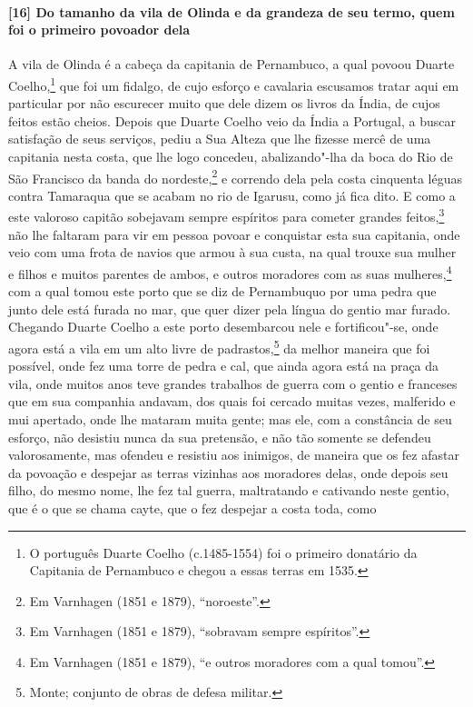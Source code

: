 \begin{linenumbers}
\paragraph{[16] Do tamanho da vila de Olinda e da grandeza de seu termo, quem foi o primeiro
povoador dela} \quad
A vila de Olinda é a cabeça da capitania de Pernambuco, a qual povoou Duarte
Coelho,\footnote{ O português Duarte Coelho (c.1485-1554) foi o primeiro donatário da
Capitania de Pernambuco e chegou a essas terras em 1535.} que foi um fidalgo, de cujo
esforço e cavalaria escusamos tratar aqui em particular por não escurecer muito que dele
dizem os livros da Índia, de cujos feitos estão cheios. Depois que Duarte Coelho veio da
Índia a Portugal, a buscar satisfação de seus serviços, pediu a Sua Alteza que lhe fizesse
mercê de uma capitania nesta costa, que lhe logo concedeu, abalizando"-lha da boca do Rio
de São Francisco da banda do nordeste,\footnote{ Em Varnhagen (1851 e 1879),
``noroeste''.} e correndo dela pela costa cinquenta léguas contra Tamaraqua que se acabam
no rio de Igarusu, como já fica dito. E como a este valoroso capitão sobejavam sempre
espíritos para cometer grandes feitos,\footnote{ Em Varnhagen (1851 e 1879), ``sobravam
sempre espíritos''.} não lhe faltaram para vir em pessoa povoar e conquistar esta sua
capitania, onde veio com uma frota de navios que armou à sua custa, na qual trouxe sua
mulher e filhos e muitos parentes de ambos, e outros moradores com as suas
mulheres,\footnote{ Em Varnhagen (1851 e 1879), ``e outros moradores com a qual tomou''.}
com a qual tomou este porto que se diz de Pernambuquo por uma pedra que junto dele está
furada no mar, que quer dizer pela língua do gentio mar furado. Chegando Duarte Coelho a
este porto desembarcou nele e fortificou"-se, onde agora está a vila em um alto livre de
padrastos,\footnote{ Monte; conjunto de obras de defesa militar.} da melhor maneira que
foi possível, onde fez uma torre de pedra e cal, que ainda agora está na praça da vila,
onde muitos anos teve grandes trabalhos de guerra com o gentio e franceses que em sua
companhia andavam, dos quais foi cercado muitas vezes, malferido e mui apertado, onde lhe
mataram muita gente; mas ele, com a constância de seu esforço, não desistiu nunca da sua
pretensão, e não tão somente se defendeu valorosamente, mas ofendeu e resistiu aos
inimigos, de maneira que os fez afastar da povoação e despejar as terras vizinhas aos
moradores delas, onde depois seu filho, do mesmo nome, lhe fez tal guerra, maltratando e
cativando neste gentio, que é o que se chama cayte, que o fez despejar a costa toda, como

\end{linenumbers}
